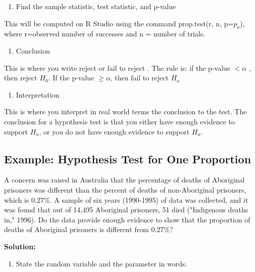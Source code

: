 \documentclass[]{book}
\providecommand{\tightlist}{%
  \setlength{\itemsep}{0pt}\setlength{\parskip}{0pt}}
\begin{document}
\begin{enumerate}
\def\labelenumi{\arabic{enumi}.}
\setcounter{enumi}{3}
\tightlist
\item
  Find the sample statistic, test statistic, and p-value
\end{enumerate}

This will be computed on R Studio using the command prop.test(r, n, p=\(p_o\)), where r=observed number of successes and n = number of trials.

\begin{enumerate}
\def\labelenumi{\arabic{enumi}.}
\setcounter{enumi}{4}
\tightlist
\item
  Conclusion
\end{enumerate}

This is where you write reject or fail to reject . The rule is: if the p-value \(<\alpha\) , then reject \(H_0\). If the p-value \(\ge\alpha\), then fail to reject \(H_o\)

\begin{enumerate}
\def\labelenumi{\arabic{enumi}.}
\setcounter{enumi}{5}
\tightlist
\item
  Interpretation
\end{enumerate}

This is where you interpret in real world terms the conclusion to the test. The conclusion for a hypothesis test is that you either have enough evidence to support \(H_a\), or you do not have enough evidence to support \(H_a\).

\hypertarget{example-hypothesis-test-for-one-proportion}{%
\subsection{Example: Hypothesis Test for One Proportion}\label{example-hypothesis-test-for-one-proportion}}

A concern was raised in Australia that the percentage of deaths of Aboriginal prisoners was different than the percent of deaths of non-Aboriginal prisoners, which is 0.27\%. A sample of six years (1990-1995) of data was collected, and it was found that out of 14,495 Aboriginal prisoners, 51 died ("Indigenous deaths in," 1996). Do the data provide enough evidence to show that the proportion of deaths of Aboriginal prisoners is different from 0.27\%?

\textbf{Solution:}

\begin{enumerate}
\def\labelenumi{\arabic{enumi}.}
\tightlist
\item
  State the random variable and the parameter in words.
\end{enumerate}
\end{document}
